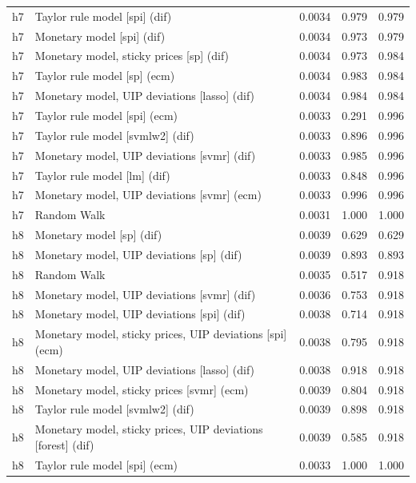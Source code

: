 \begin{ThreePartTable}
\begin{longtable}[t]{cp{5.5cm}ccc}
\addlinespace
h7 & \raggedright Taylor rule model [spi] (dif) & 0.0034 & 0.979 & 0.979\\
h7 & \raggedright Monetary model [spi] (dif) & 0.0034 & 0.973 & 0.979\\
h7 & \raggedright Monetary model, sticky prices [sp] (dif) & 0.0034 & 0.973 & 0.984\\
h7 & \raggedright Taylor rule model [sp] (ecm) & 0.0034 & 0.983 & 0.984\\
h7 & \raggedright Monetary model, UIP deviations [lasso] (dif) & 0.0034 & 0.984 & 0.984\\
h7 & \raggedright Taylor rule model [spi] (ecm) & 0.0033 & 0.291 & 0.996\\
h7 & \raggedright Taylor rule model [svmlw2] (dif) & 0.0033 & 0.896 & 0.996\\
h7 & \raggedright Monetary model, UIP deviations [svmr] (dif) & 0.0033 & 0.985 & 0.996\\
h7 & \raggedright Taylor rule model [lm] (dif) & 0.0033 & 0.848 & 0.996\\
h7 & \raggedright Monetary model, UIP deviations [svmr] (ecm) & 0.0033 & 0.996 & 0.996\\
h7 & \raggedright Random Walk & 0.0031 & 1.000 & 1.000\\
\addlinespace
h8 & \raggedright Monetary model [sp] (dif) & 0.0039 & 0.629 & 0.629\\
h8 & \raggedright Monetary model, UIP deviations [sp] (dif) & 0.0039 & 0.893 & 0.893\\
h8 & \raggedright Random Walk & 0.0035 & 0.517 & 0.918\\
h8 & \raggedright Monetary model, UIP deviations [svmr] (dif) & 0.0036 & 0.753 & 0.918\\
h8 & \raggedright Monetary model, UIP deviations [spi] (dif) & 0.0038 & 0.714 & 0.918\\
h8 & \raggedright Monetary model, sticky prices, UIP deviations [spi] (ecm) & 0.0038 & 0.795 & 0.918\\
h8 & \raggedright Monetary model, UIP deviations [lasso] (dif) & 0.0038 & 0.918 & 0.918\\
h8 & \raggedright Monetary model, sticky prices [svmr] (ecm) & 0.0039 & 0.804 & 0.918\\
h8 & \raggedright Taylor rule model [svmlw2] (dif) & 0.0039 & 0.898 & 0.918\\
h8 & \raggedright Monetary model, sticky prices, UIP deviations [forest] (dif) & 0.0039 & 0.585 & 0.918\\
h8 & \raggedright Taylor rule model [spi] (ecm) & 0.0033 & 1.000 & 1.000\\

\end{longtable}
\end{ThreePartTable}
